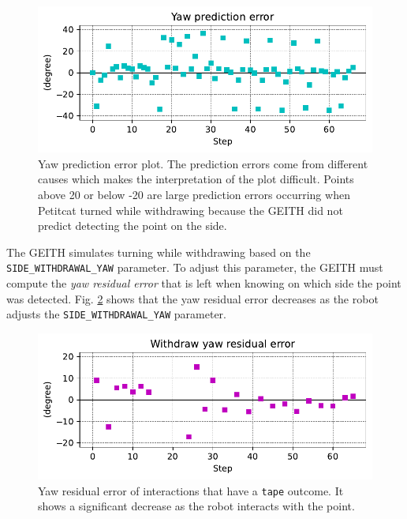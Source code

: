 \documentclass[runningheads]{llncs}
\begin{document}
\begin{figure}
	\includegraphics[width=\textwidth]{02_yaw_pe.pdf}
	\caption{Yaw prediction error plot. The prediction errors come from different causes which makes the interpretation of the plot difficult. 
		Points above 20 or below -20 are large prediction errors occurring when Petitcat turned while withdrawing because the GEITH did not predict detecting the point on the side.
	} \label{fig:yaw_pe}
\end{figure}

The GEITH simulates turning while withdrawing based on the \texttt{SIDE\_WITH\-DRA\-WAL\_YAW} parameter.
To adjust this parameter, the GEITH must 
compute the \textit{yaw residual error} 
that is left when knowing on which side the point was detected. 
Fig. \ref{fig:yaw_re} shows that the yaw residual error decreases as the robot adjusts the \texttt{SIDE\_WITH\-DRA\-WAL\_YAW} parameter.

\begin{figure}
	\includegraphics[width=\textwidth]{03_yaw_re.pdf}
	\caption{Yaw residual error of interactions that have a \texttt{tape} outcome. 
		It shows a significant decrease as the robot interacts with the point.
	} \label{fig:yaw_re}
\end{figure}
\end{document}
